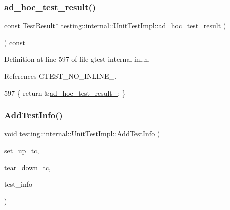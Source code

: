 \subsubsection{\texorpdfstring{ad\+\_\+hoc\+\_\+test\+\_\+result()}{ad\_hoc\_test\_result()}}
{\footnotesize\ttfamily const \hyperlink{classtesting_1_1TestResult}{Test\+Result}$\ast$ testing\+::internal\+::\+Unit\+Test\+Impl\+::ad\+\_\+hoc\+\_\+test\+\_\+result (\begin{DoxyParamCaption}{ }\end{DoxyParamCaption}) const\hspace{0.3cm}{\ttfamily [inline]}}



Definition at line 597 of file gtest-\/internal-\/inl.\+h.



References G\+T\+E\+S\+T\+\_\+\+N\+O\+\_\+\+I\+N\+L\+I\+N\+E\+\_\+.


\begin{DoxyCode}
597 \{ \textcolor{keywordflow}{return} &\hyperlink{classtesting_1_1internal_1_1UnitTestImpl_a15355228a7140a08f9e2f333aa934ccd}{ad\_hoc\_test\_result\_}; \}
\end{DoxyCode}
\mbox{\label{classtesting_1_1internal_1_1UnitTestImpl_a1cc87dfc91377ebec4a3ff4192dfcba9}} 
\subsubsection{\texorpdfstring{Add\+Test\+Info()}{AddTestInfo()}}
{\footnotesize\ttfamily void testing\+::internal\+::\+Unit\+Test\+Impl\+::\+Add\+Test\+Info (\begin{DoxyParamCaption}\item[{\hyperlink{classtesting_1_1Test_a5f2a051d1d99c9b784c666c586186cf9}{Test\+::\+Set\+Up\+Test\+Case\+Func}}]{set\+\_\+up\+\_\+tc,  }\item[{\hyperlink{classtesting_1_1Test_aa0f532e93b9f3500144c53f31466976c}{Test\+::\+Tear\+Down\+Test\+Case\+Func}}]{tear\+\_\+down\+\_\+tc,  }\item[{\hyperlink{classtesting_1_1TestInfo}{Test\+Info} $\ast$}]{test\+\_\+info }\end{DoxyParamCaption})\hspace{0.3cm}{\ttfamily [inline]}}



